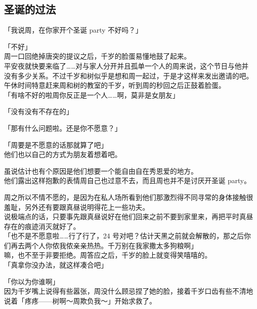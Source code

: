 \subsection{圣诞的过法}

「我说周，在你家开个圣诞 party 不好吗？」

「不好」\\

周一口回绝掉唐突的提议之后，千岁的脸蛋易懂地鼓了起来。\\

平安夜就快要来临了……对与家人分开并且孤单一个人的周来说，这个节日与他并没有多少关系。不过千岁和树似乎是想和周一起过，于是才这样来发出邀请的吧。\\

午休时间特意赶来周和树的教室的千岁，听到周的秒回之后正鼓着脸蛋。\\

「有啥不好的啦周你反正是一个人……啊，莫非是女朋友」

「没有没有不存在的」

「那有什么问题啦。还是你不愿意？」

「周要是不愿意的话那就算了吧」\\

他们也以自己的方式为朋友着想着吧。

虽说估计也有个原因是他们想要一个能自由自在秀恩爱的地方。\\

他们露出这样抱歉的表情周自己也过意不去，而且周也并不是讨厌开圣诞 party。

周之所以不情不愿的，是因为在私人场所看到他们那激烈得不同寻常的身体接触很羞耻，另外还有要跟真昼说明得花上一些功夫。\\

说极端点的话，只要事先跟真昼说好在他们回来之前不要到家里来，再把平时真昼存在的痕迹消灭就好了。\\

「也不是不愿意啦……行了行了，24 号对吧？估计天黑之前就会解散的，那之后你们再去两个人你侬我侬亲亲热热。千万别在我家撒太多狗粮啊」\\

嘛，也不至于非要拒绝。周答应之后，千岁的脸上就变得笑嘻嘻的。\\

「真拿你没办法，就这样凑合吧」

「你以为你谁啊」\\

因为千岁嘴上说得有些嚣张，周没什么顾忌捏了她的脸，接着千岁口齿有些不清地说着「疼疼——树啊～周欺负我～」开始求救了。\\

